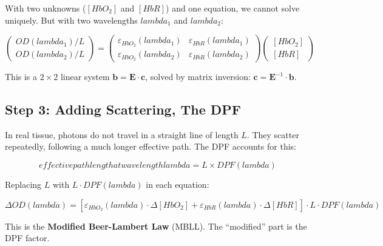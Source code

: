 \documentclass[12pt]{article}
\def\lambda{lambda}%
\def\text#1{#1}%
\begin{document}
With two unknowns ($[\text{HbO}_2]$ and $[\text{HbR}]$) and one equation, we cannot solve uniquely. But with two wavelengths $\lambda_1$ and $\lambda_2$:

\begin{equation}
\begin{pmatrix} \text{OD}(\lambda_1)/L \\ \text{OD}(\lambda_2)/L \end{pmatrix}
= \begin{pmatrix} \varepsilon_{\text{HbO}_2}(\lambda_1) & \varepsilon_{\text{HbR}}(\lambda_1) \\ \varepsilon_{\text{HbO}_2}(\lambda_2) & \varepsilon_{\text{HbR}}(\lambda_2) \end{pmatrix}
\begin{pmatrix} [\text{HbO}_2] \\ [\text{HbR}] \end{pmatrix}
\end{equation}

This is a $2 \times 2$ linear system $\mathbf{b} = \mathbf{E} \cdot \mathbf{c}$, solved by matrix inversion: $\mathbf{c} = \mathbf{E}^{-1} \cdot \mathbf{b}$.

\subsection{Step 3: Adding Scattering, The DPF}

In real tissue, photons do not travel in a straight line of length $L$. They scatter repeatedly, following a much longer effective path. The DPF accounts for this:

\begin{equation}
\text{effective path length at wavelength } \lambda = L \times \text{DPF}(\lambda)
\end{equation}

Replacing $L$ with $L \cdot \text{DPF}(\lambda)$ in each equation:

\begin{equation}
\Delta\text{OD}(\lambda) = \left[\varepsilon_{\text{HbO}_2}(\lambda) \cdot \Delta[\text{HbO}_2] + \varepsilon_{\text{HbR}}(\lambda) \cdot \Delta[\text{HbR}]\right] \cdot L \cdot \text{DPF}(\lambda)
\end{equation}

This is the \textbf{Modified Beer-Lambert Law} (MBLL). The ``modified'' part is the DPF factor.
\end{document}
